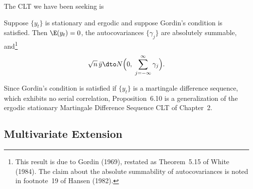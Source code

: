The CLT we have been seeking is

\begin{proposition}
\label{prop:6.10}
Suppose $\{y_t\}$ is stationary and ergodic and suppose Gordin's condition is satisfied.
Then $\E(y_t) = 0$, the autocovariances $\{\gamma_j\}$ are absolutely summable, and\footnote{This result is due to Gordin (1969), restated as Theorem~5.15 of White (1984). The claim about the absolute summability of autocovariances is noted in footnote~19 of Hansen (1982).}
\begin{equation*}
  \sqrt{n}\,\bar{y} \dto N\Bigl(0,\; \sum_{j=-\infty}^{\infty} \gamma_j\Bigr).
\end{equation*}
\end{proposition}

Since Gordin's condition is satisfied if $\{y_t\}$ is a martingale difference sequence,
which exhibits no serial correlation, Proposition~6.10 is a generalization of the
ergodic stationary Martingale Difference Sequence CLT of Chapter~2.

\subsection*{Multivariate Extension}

